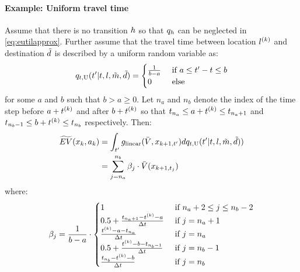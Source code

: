 \paragraph{Example: Uniform travel time}
Assume that there is no transition $h$ so that $q_h$ can be neglected in \eqref{eq:eutilapprox}. Further assume that the travel time between location $l^{(k)}$ and destination $\tilde{d}$ is described by a uniform random variable as:
\begin{equation*}
	q_{t,\text{U}}(t'|t,l,\act{m},\act{d})=\begin{cases}
	\frac{1}{b-a} & \cif a \leq t' - t \leq b \\
	0 & \celse
	\end{cases}
\end{equation*}
for some $a$ and $b$ such that $b> a \geq 0$. Let $n_a$ and $n_b$ denote the index of the time step before $a+t^{(k)}$ and after $b+t^{(k)}$ so that $t_{n_a} \leq a+t^{(k)} \leq t_{n_a+1}$ and $t_{n_b-1} \leq b+t^{(k)} \leq t_{n_b}$ respectively. Then:
\begin{equation*}
\begin{aligned}
\aeutil(x_k,a_k)&= \int_{t'} g_\text{linear}(\ev,x_{k+1,t'})dq_{t,\text{U}}(t'|t,l,\act{m},\act{d}))\\
&=\sum_{j=n_a}^{n_b} \beta_j \cdot \ev(x_{k+1,t_j})
\end{aligned}
\end{equation*}
where:
\begin{equation*}
\beta_j = \frac{1}{b-a} \cdot \begin{cases}
1 & \cif n_a +2 \leq j \leq n_{b}-2 \\
0.5 + \frac{t_{n_a+1}-t\ks{k} - a}{\Delta t} & \cif j = n_a +1  \\
\frac{t\ks{k} - a -t_{n_a}}{\Delta t} & \cif j = n_a \\
0.5 + \frac{t\ks{k} - b -t_{n_{b}-1}}{\Delta t} & \cif j = n_{b}-1  \\
\frac{t_{n_b}-t\ks{k} - b}{\Delta t} & \cif j = n_b\\
\end{cases}
\end{equation*}

